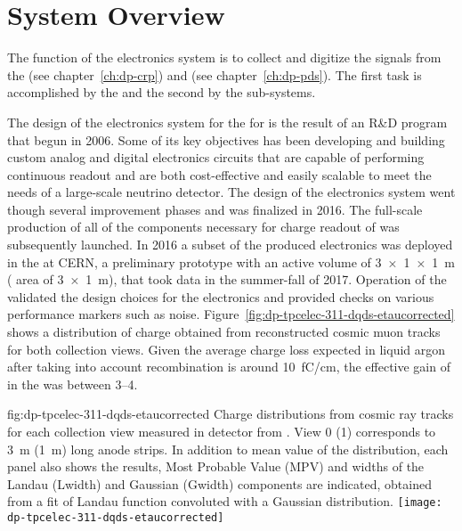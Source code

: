 \section{System Overview}
\label{sec:dp-tpcelec-overview}

The function of the   electronics system is to collect and digitize the signals from the  (see chapter~\ref{ch:dp-crp}) and  (see chapter~\ref{ch:dp-pds}). The first task is accomplished by the  and the second by the  sub-systems. 

The design of the electronics system for the for   is the result of an R\&D program that begun in 2006. Some of its key objectives has been developing and building custom analog and digital electronics circuits that are capable of performing continuous readout and are both cost-effective and easily scalable to meet the needs of a large-scale neutrino  detector. The design of the electronics system went though several improvement phases and was finalized in 2016. The full-scale production of all of the components necessary for charge readout of  was subsequently launched. In 2016 a subset of the produced electronics was deployed in the  at CERN, a preliminary \dual \lartpc prototype with an active volume  of \SI[product-units=power]{3x1x1}{m} ( area of \SI[product-units=power]{3x1}{m}), that took data in the summer-fall of 2017. Operation of the  \cite{Aimard:2018yxp} validated the design choices for the electronics and provided checks on various performance markers such as noise. Figure~\ref{fig:dp-tpcelec-311-dqds-etaucorrected} shows a distribution of charge obtained from reconstructed cosmic muon tracks for both collection views. Given the average  charge loss expected in liquid argon after taking into account recombination is around \SI{10}{\femto\coulomb/\cm}, the effective gain of  in the  was between \numrange{3}{4}.

\begin{dunefigure}{fig:dp-tpcelec-311-dqds-etaucorrected}
{Charge distributions from cosmic ray tracks for each collection view measured in  detector from \cite{Aimard:2018yxp}. View \num{0} (\num{1}) corresponds to \SI{3}{\meter} (\SI{1}{\meter}) long anode strips. In addition to mean value of the distribution, each panel also shows the results, Most Probable Value (MPV) and widths of the Landau (Lwidth) and Gaussian (Gwidth) components are indicated, obtained from a fit of Landau function convoluted with a Gaussian distribution.}
\texttt{[image: dp-tpcelec-311-dqds-etaucorrected]}
\end{dunefigure}

